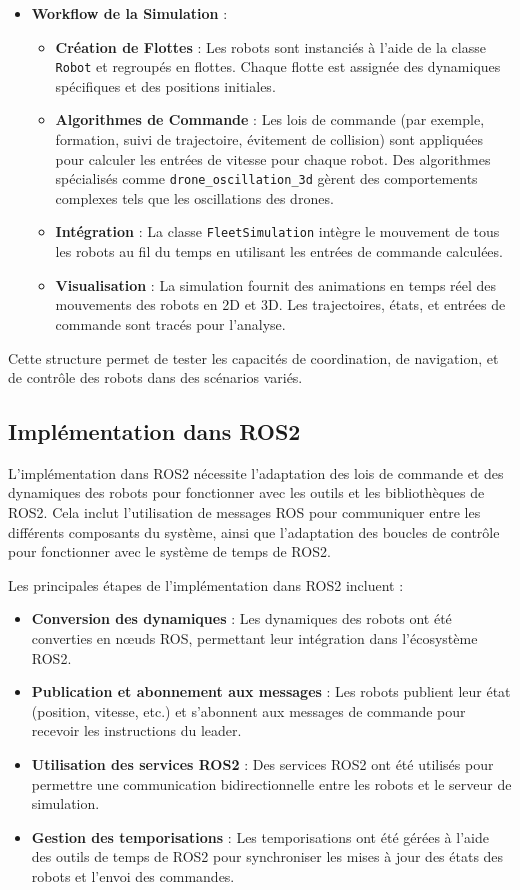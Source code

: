\documentclass[a4paper,12pt]{article}
\begin{document}
\begin{itemize}
    \item \textbf{Workflow de la Simulation} :
    \begin{itemize}
        \item \textbf{Création de Flottes} : Les robots sont instanciés à l'aide de la classe \texttt{Robot} et regroupés en flottes. Chaque flotte est assignée des dynamiques spécifiques et des positions initiales.
        \item \textbf{Algorithmes de Commande} : Les lois de commande (par exemple, formation, suivi de trajectoire, évitement de collision) sont appliquées pour calculer les entrées de vitesse pour chaque robot. Des algorithmes spécialisés comme \texttt{drone\_oscillation\_3d} gèrent des comportements complexes tels que les oscillations des drones.
        \item \textbf{Intégration} : La classe \texttt{FleetSimulation} intègre le mouvement de tous les robots au fil du temps en utilisant les entrées de commande calculées.
        \item \textbf{Visualisation} : La simulation fournit des animations en temps réel des mouvements des robots en 2D et 3D. Les trajectoires, états, et entrées de commande sont tracés pour l'analyse.
    \end{itemize}
\end{itemize}

Cette structure permet de tester les capacités de coordination, de navigation, et de contrôle des robots dans des scénarios variés.

\subsection*{Implémentation dans ROS2}
L'implémentation dans ROS2 nécessite l'adaptation des lois de commande et des dynamiques des robots pour fonctionner avec les outils et les bibliothèques de ROS2. Cela inclut l'utilisation de messages ROS pour communiquer entre les différents composants du système, ainsi que l'adaptation des boucles de contrôle pour fonctionner avec le système de temps de ROS2.

Les principales étapes de l'implémentation dans ROS2 incluent :
\begin{itemize}
    \item \textbf{Conversion des dynamiques} : Les dynamiques des robots ont été converties en nœuds ROS, permettant leur intégration dans l'écosystème ROS2.
    \item \textbf{Publication et abonnement aux messages} : Les robots publient leur état (position, vitesse, etc.) et s'abonnent aux messages de commande pour recevoir les instructions du leader.
    \item \textbf{Utilisation des services ROS2} : Des services ROS2 ont été utilisés pour permettre une communication bidirectionnelle entre les robots et le serveur de simulation.
    \item \textbf{Gestion des temporisations} : Les temporisations ont été gérées à l'aide des outils de temps de ROS2 pour synchroniser les mises à jour des états des robots et l'envoi des commandes.
\end{itemize}
\end{document}
